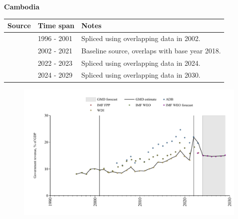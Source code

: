 \documentclass[12pt,a4paper,landscape]{article}
\begin{document}
\begin{adjustbox}{max totalsize={\paperwidth}{\paperheight},center}
\begin{minipage}[t][\textheight][t]{\textwidth}
\vspace*{0.5cm}
{}
\begin{center}
{\Large\bfseries Cambodia}
\end{center}
\vspace{0.5cm}
\begin{table}[H]
\centering
\small
\begin{tabular}{|l|l|l|}
\hline
\textbf{Source} & \textbf{Time span} & \textbf{Notes} \\
\hline
\rowcolor{white}\cite{IMF_WEO}& 1996 - 2001 &Spliced using overlapping data in 2002.\\
\rowcolor{lightgray}\cite{WDI}& 2002 - 2021 &Baseline source, overlaps with base year 2018.\\
\rowcolor{white}\cite{ADB}& 2022 - 2023 &Spliced using overlapping data in 2024.\\
\rowcolor{lightgray}\cite{IMF_WEO_forecast}& 2024 - 2029 &Spliced using overlapping data in 2030.\\
\hline
\end{tabular}
\end{table}
\begin{figure}[H]
\centering
\includegraphics[width=\textwidth,height=0.6\textheight,keepaspectratio]{graphs/KHM_govrev_GDP.pdf}
\end{figure}
\end{minipage}
\end{adjustbox}
\end{document}
